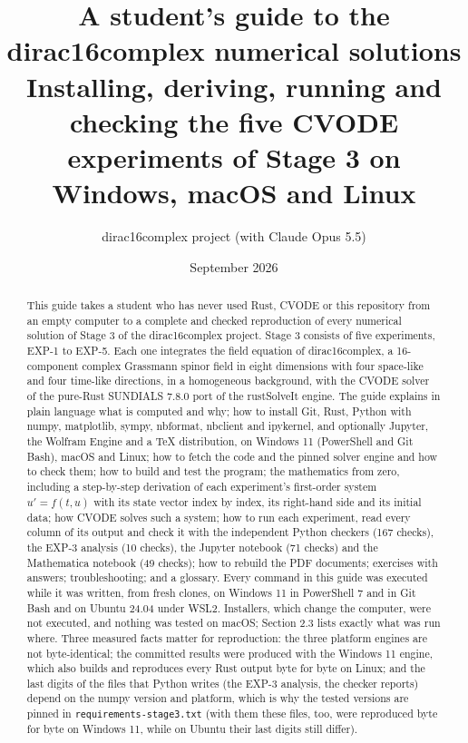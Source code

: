 \documentclass[11pt]{article}
\title{A student's guide to the dirac16complex numerical solutions\\[0.5em]\large Installing, deriving, running and checking the five CVODE experiments of Stage 3 on Windows, macOS and Linux}
\author{dirac16complex project (with Claude Opus 5.5)}
\date{September 2026}
\begin{document}
\maketitle
\tableofcontents
\newpage
\begin{abstract}
This guide takes a student who has never used Rust, CVODE or this repository from an empty computer to a complete and checked reproduction of every numerical solution of Stage 3 of the dirac16complex project. Stage 3 consists of five experiments, EXP-1 to EXP-5. Each one integrates the field equation of dirac16complex, a 16-component complex Grassmann spinor field in eight dimensions with four space-like and four time-like directions, in a homogeneous background, with the CVODE solver of the pure-Rust SUNDIALS 7.8.0 port of the rustSolveIt engine. The guide explains in plain language what is computed and why; how to install Git, Rust, Python with numpy, matplotlib, sympy, nbformat, nbclient and ipykernel, and optionally Jupyter, the Wolfram Engine and a TeX distribution, on Windows 11 (PowerShell and Git Bash), macOS and Linux; how to fetch the code and the pinned solver engine and how to check them; how to build and test the program; the mathematics from zero, including a step-by-step derivation of each experiment's first-order system $u'=f(t,u)$ with its state vector index by index, its right-hand side and its initial data; how CVODE solves such a system; how to run each experiment, read every column of its output and check it with the independent Python checkers (167 checks), the EXP-3 analysis (10 checks), the Jupyter notebook (71 checks) and the Mathematica notebook (49 checks); how to rebuild the PDF documents; exercises with answers; troubleshooting; and a glossary. Every command in this guide was executed while it was written, from fresh clones, on Windows 11 in PowerShell 7 and in Git Bash and on Ubuntu 24.04 under WSL2. Installers, which change the computer, were not executed, and nothing was tested on macOS; Section 2.3 lists exactly what was run where. Three measured facts matter for reproduction: the three platform engines are not byte-identical; the committed results were produced with the Windows 11 engine, which also builds and reproduces every Rust output byte for byte on Linux; and the last digits of the files that Python writes (the EXP-3 analysis, the checker reports) depend on the numpy version and platform, which is why the tested versions are pinned in \texttt{requirem\allowbreak{}ents-sta\allowbreak{}ge3.txt} (with them these files, too, were reproduced byte for byte on Windows 11, while on Ubuntu their last digits still differ).

\end{abstract}
\end{document}
